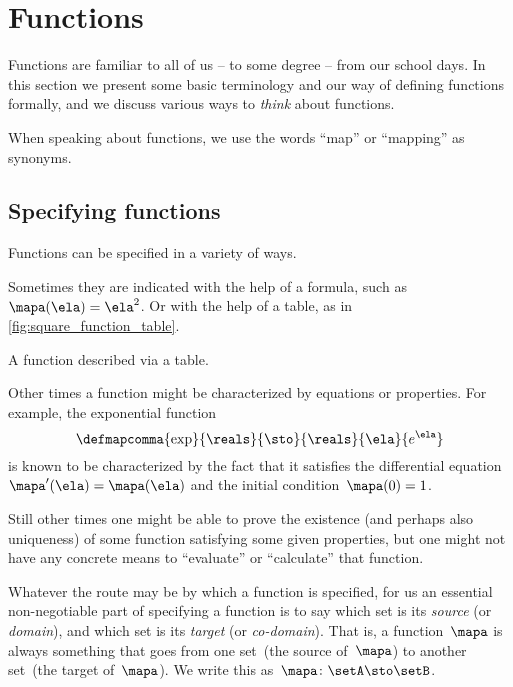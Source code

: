 
\section{Functions}
\label{sec:functions}

Functions are familiar to all of us -- to some degree -- from our school days.
In this section we present some basic terminology and our way of defining functions formally, and we discuss various ways to \emph{think} about functions.

When speaking about functions, we use the words ``map'' or ``mapping'' as synonyms.

\subsection{Specifying functions}
\label{sec:domain-codomain}

Functions can be specified in a variety of ways.

Sometimes they are indicated with the help of a formula, such as~$\mapa(\ela)=\ela^2$.
Or with the help of a table, as in \cref{fig:square_function_table}.

\begin{marginfigure}
    \centering
    \caption{A function described via a table.}
    \label{fig:square_function_table}
\end{marginfigure}

Other times a function might be characterized by equations or properties.
For example, the exponential function
\begin{equation}
    \defmapcomma{
        \exp
    }{
        \reals
    }{
        \sto
    }{
        \reals
    }{
        \ela
    }{
        e^\ela
    }
\end{equation}
is known to be characterized by the fact that it satisfies the differential equation~$\mapa'(\ela) = \mapa(\ela)$ and the initial condition~$\mapa(0) =1$.

Still other times one might be able to prove the existence (and perhaps also uniqueness) of some function satisfying some given properties, but one might not have any concrete means to ``evaluate'' or ``calculate'' that function.

Whatever the route may be by which a function is specified, for us an essential non-negotiable part of specifying a function is to say which set is its \emph{source} (or \emph{domain}), and which set is its \emph{target} (or \emph{co-domain}).
That is, a function~$\mapa$ is always something that goes from one set~\setA (the source of~$\mapa$) to another set~\setB (the target of~$\mapa$).
We write this as~$\mapa\colon \setA \sto \setB$.

